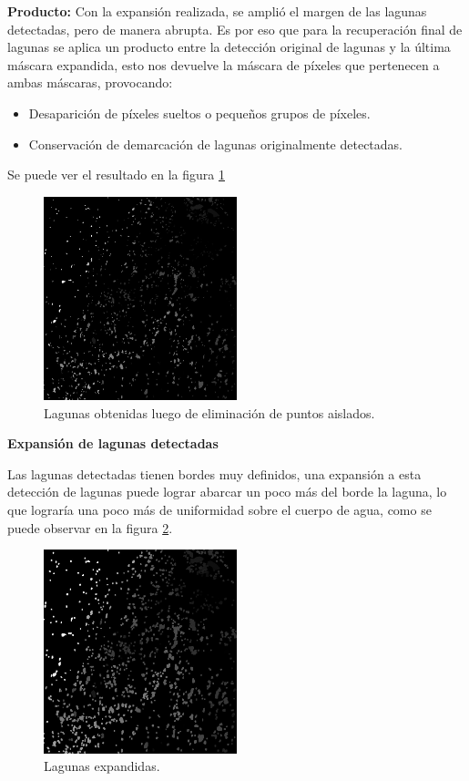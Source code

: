 \documentclass[10pt,a4paper, twoside]{report}
\begin{document}
		\textbf{Producto:} Con la expansión realizada, se amplió el margen de las lagunas detectadas, pero de manera abrupta. Es por eso que para la recuperación final de lagunas se aplica un producto entre la detección original de lagunas y la última máscara expandida, esto nos devuelve la máscara de píxeles que pertenecen a ambas máscaras, provocando:
		
		\begin{itemize}
			\item Desaparición de píxeles sueltos o pequeños grupos de píxeles.
			\item Conservación de demarcación de lagunas originalmente detectadas.
		\end{itemize}		
		
		Se puede ver el resultado en la figura \ref{lagunasDetectadas}

\begin{figure}[H]
   \centering      
   \includegraphics[width=0.5\textwidth]{imagenes/lagunasDetectadas.jpg}
 \caption{Lagunas obtenidas luego de eliminación de puntos aislados.}
 \label{lagunasDetectadas}
\end{figure}		
		
\textbf{Expansión de lagunas detectadas}

Las lagunas detectadas tienen bordes muy definidos, una expansión a esta detección de lagunas puede lograr abarcar un poco más del borde la laguna, lo que lograría una poco más de uniformidad sobre el cuerpo de agua, como se puede observar en la figura \ref{dilationLagoons}.

\begin{figure}[H]
   \centering      
   \includegraphics[width=0.5\textwidth]{imagenes/dilationLagoons.jpg}
 \caption{Lagunas expandidas.}
 \label{dilationLagoons}
\end{figure}		
\end{document}
